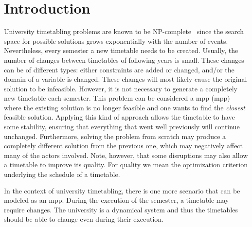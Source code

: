 \documentclass[runningheads]{llncs}
\begin{document}
\begin{abstract}

  
\end{abstract}
\section{Introduction}


University timetabling problems are known to be NP-complete~\cite{DBLP:journals/siamcomp/EvenIS76} since the search space for possible solutions grows exponentially with the number of events. Nevertheless, every semester a new timetable needs to be created. Usually, the number of changes between timetables of following years is small. These changes can be of different types: either constraints are added or changed, and/or the domain of a variable is changed. These changes will most likely cause the original solution to be infeasible. However, it is not necessary to generate a completely new timetable each semester. This problem can be considered a \acrlong{mpp} (\gls{mpp}) where the existing solution is no longer feasible and one wants to find the \textit{closest} feasible solution. Applying this kind of approach allows the timetable to have some stability, ensuring that everything that went well previously will continue unchanged.  Furthermore, solving the problem from scratch may produce a completely different solution from the previous one, which may negatively affect many of the actors involved. Note, however, that some disruptions may also allow a timetable to improve its quality. For quality we mean the optimization criterion underlying the schedule of a timetable. %

In the context of university timetabling, there is one more scenario that can be modeled as an \gls{mpp}. During the execution of the semester, a timetable may require changes. The university is a dynamical system and thus the timetables should be able to change even during their execution.
\end{document}
